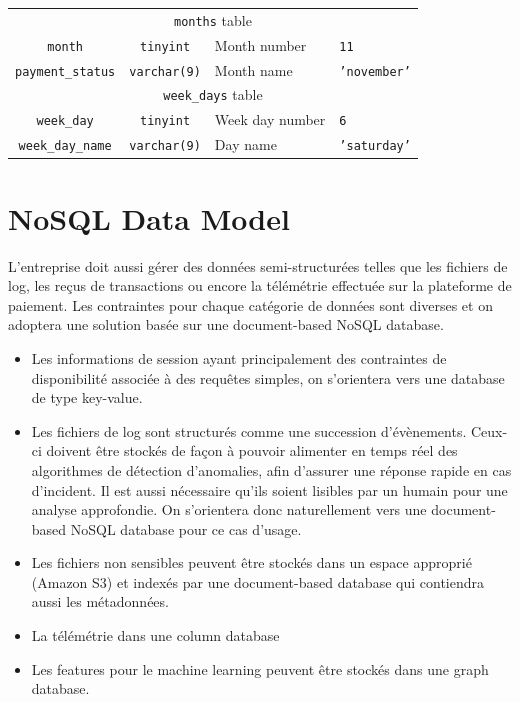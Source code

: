 \documentclass[11pt,a4paper,computermodern]{article}
\newcommand{\code}{\texttt}
\begin{document}
\begin{table}[ht]
\begin{threeparttable}
\begin{tabularx}{0.99\textwidth}{c c >{\centering\arraybackslash}X >{\centering\arraybackslash}X}
			\midrule
			\multicolumn{4}{c}{\code{months} table}\\
			\code{month} & \code{tinyint} & Month number & \code{11} \\
			\code{payment\_status} & \code{varchar(9)} & Month name & \code{'november'} \\
			
			\midrule
			\multicolumn{4}{c}{\code{week\_days} table}\\
			\code{week\_day} & \code{tinyint} & Week day number & \code{6} \\
			\code{week\_day\_name} & \code{varchar(9)} & Day name & \code{'saturday'} \\
			
			\bottomrule
		\end{tabularx}
	\end{threeparttable}
\end{table}


\section*{NoSQL Data Model}

L'entreprise doit aussi gérer des données semi-structurées telles que les fichiers de log, les reçus de transactions ou encore la télémétrie effectuée sur la plateforme de paiement. Les contraintes pour chaque catégorie de données sont diverses et on adoptera une solution basée sur une document-based NoSQL database.

\begin{itemize}
	\item Les informations de session ayant principalement des contraintes de disponibilité associée à des requêtes simples, on s'orientera vers une database de type key-value.
	\item Les fichiers de log sont structurés comme une succession d'évènements. Ceux-ci doivent être stockés de façon à pouvoir alimenter en temps réel des algorithmes de détection d'anomalies, afin d'assurer une réponse rapide en cas d'incident. Il est aussi nécessaire qu'ils soient lisibles par un humain pour une analyse approfondie. On s'orientera donc naturellement vers une document-based NoSQL database pour ce cas d'usage.
	\item Les fichiers non sensibles peuvent être stockés dans un espace approprié (Amazon S3) et indexés par une document-based database qui contiendra aussi les métadonnées.
	\item La télémétrie dans une column database
	\item Les features pour le machine learning peuvent être stockés dans une graph database.
\end{itemize}
\end{document}
